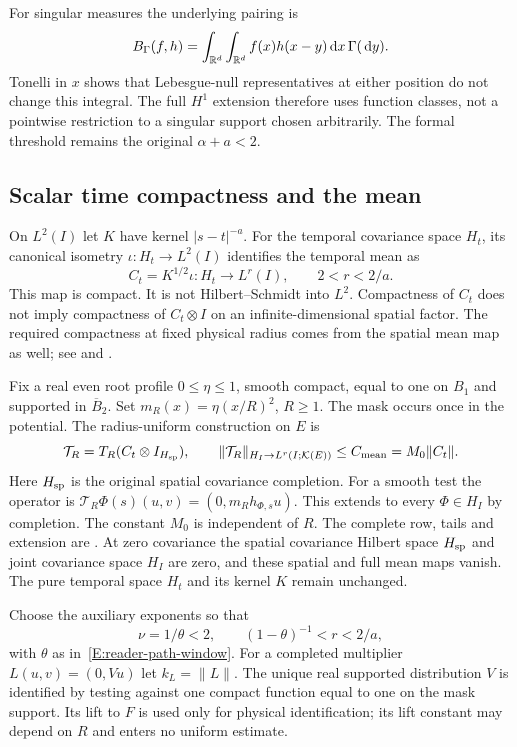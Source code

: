 For singular measures the underlying pairing is
\[
  B_\Gamma(f,h)=\int_{\mathbb R^d}\int_{\mathbb R^d}
  f(x)h(x-y)\,\mathrm d x\,\Gamma(\,\mathrm d y).
\]
Tonelli in $x$ shows that Lebesgue-null representatives at either position do
not change this integral. The full $H^1$ extension therefore uses function
classes, not a pointwise restriction to a singular support chosen arbitrarily.
The formal threshold remains the original $\alpha+a < 2$.

\subsection{Scalar time compactness and the mean}

On $L^2(I)$ let $K$ have kernel $|s-t|^{-a}$. For the temporal covariance space
$H_t$, its canonical isometry $\iota:H_t \to L^2(I)$ identifies the temporal
mean as
\[
  C_t=K^{1/2}\iota:H_t\longrightarrow L^r(I),\qquad 2<r<2/a.
\]
This map is compact. It is not Hilbert--Schmidt into $L^2$. Compactness of $C_t$
does not imply compactness of $C_t\otimes I$ on an infinite-dimensional spatial
factor. The required compactness at fixed physical radius comes from the spatial
mean map as well; see  and
.

Fix a real even root profile $0 \le \eta \le 1$, smooth compact, equal to one on
$B_1$ and supported in $\overline{B}_2$. Set $m_R(x) = \eta(x/R)^2$, $R \ge 1$.
The mask occurs once in the potential. The radius-uniform construction on $E$ is
\begin{equation}\label{E:reader-mean-map}
  \mathcal{T}_R=T_R(C_t\otimes I_{H_{\rm sp}}),\qquad
  \|\mathcal{T}_R\|_{H_I\to L^r(I;\mathcal K(E))}
  \le C_{\rm mean}=M_0\|C_t\|.
\end{equation}
Here $H_{\rm sp}$ is the original spatial covariance completion. For a smooth
test the operator is $\mathcal{T}_R\Phi(s)(u,v) = (0,m_Rh_{\Phi,s}u)$. This
extends to every $\Phi \in H_I$ by completion. The constant $M_0$ is independent
of $R$. The complete row, tails and extension are
. At zero covariance the spatial
covariance Hilbert space $H_{\rm sp}$ and joint covariance space $H_I$ are zero,
and these spatial and full mean maps vanish. The pure temporal space $H_t$ and
its kernel $K$ remain unchanged.

Choose the auxiliary exponents so that
\begin{equation}\label{E:reader-uniform-window}
  \nu=1/\theta<2,\qquad
  (1-\theta)^{-1}<r<2/a,
\end{equation}
with $\theta$ as in~\eqref{E:reader-path-window}. For a completed multiplier
$L(u,v) = (0,Vu)$ let $k_L = \|L\|$. The unique real supported distribution $V$
is identified by testing against one compact function equal to one on the mask
support. Its lift to $F$ is used only for physical identification; its lift
constant may depend on $R$ and enters no uniform estimate.

